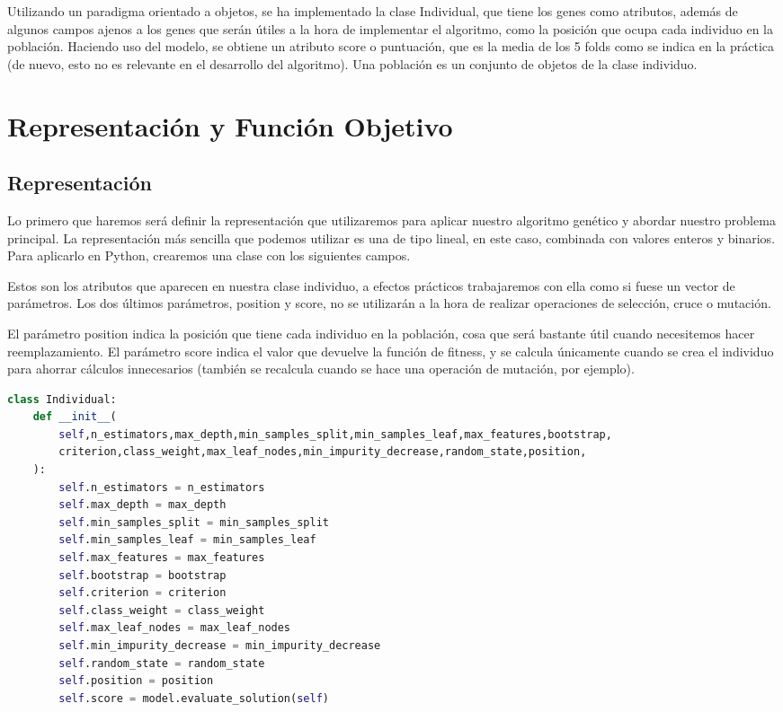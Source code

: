 \documentclass{article}
\begin{document}
\begin{spacing}{1.3}
Utilizando un paradigma orientado a objetos, se ha implementado la clase Individual, que tiene
los genes como atributos, además de algunos campos ajenos a los genes que serán útiles a la hora de implementar el algoritmo, 
como la posición que ocupa cada individuo en la población. Haciendo uso del modelo, se obtiene un atributo score o puntuación, 
que es la media de los 5 folds como se indica en la práctica (de nuevo, esto no es relevante en el desarrollo del algoritmo). 
Una población es un conjunto
de objetos de la clase individuo.

\section{Representación y Función Objetivo}
\subsection{Representación}
Lo primero que haremos será definir la representación que utilizaremos para aplicar nuestro algoritmo
genético y abordar nuestro problema principal. La representación más sencilla que podemos utilizar es 
una de tipo lineal, en este caso, combinada con valores enteros y binarios. Para aplicarlo en Python, 
crearemos una clase con los siguientes campos.

Estos son los atributos que aparecen en nuestra clase individuo, a efectos prácticos
trabajaremos con ella como si fuese un vector de parámetros. Los dos últimos parámetros,
position y score, no se utilizarán a la hora de realizar operaciones de selección, cruce o mutación.\newline

El parámetro position indica la posición que tiene cada individuo en la población, cosa que será bastante útil
cuando necesitemos hacer reemplazamiento. El parámetro score indica el valor que devuelve la función de fitness,
y se calcula únicamente cuando se crea el individuo para ahorrar cálculos innecesarios (también se recalcula cuando
se hace una operación de mutación, por ejemplo).\newline

\begin{lstlisting}[language=Python, caption=Constructor de la clase Individuo]
  class Individual:
    def __init__(
        self,n_estimators,max_depth,min_samples_split,min_samples_leaf,max_features,bootstrap,
        criterion,class_weight,max_leaf_nodes,min_impurity_decrease,random_state,position,
    ):
        self.n_estimators = n_estimators
        self.max_depth = max_depth
        self.min_samples_split = min_samples_split
        self.min_samples_leaf = min_samples_leaf
        self.max_features = max_features
        self.bootstrap = bootstrap
        self.criterion = criterion
        self.class_weight = class_weight
        self.max_leaf_nodes = max_leaf_nodes
        self.min_impurity_decrease = min_impurity_decrease
        self.random_state = random_state
        self.position = position
        self.score = model.evaluate_solution(self)
\end{lstlisting}

\end{spacing}
\end{document}
